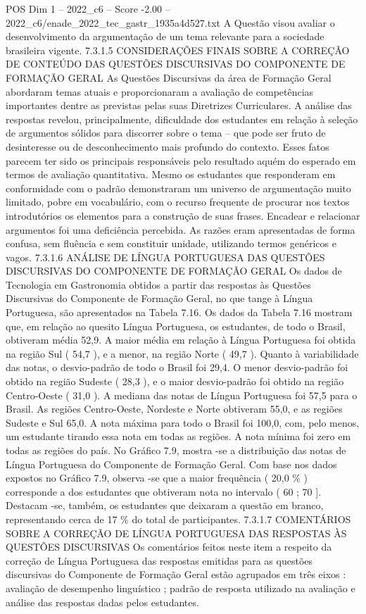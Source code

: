 \begin{textsample}{POS Dim 1 – 2022\_c6 – Score -2.00 – 2022\_c6/enade\_2022\_tec\_gastr\_1935a4d527.txt}
A Questão visou avaliar o desenvolvimento da argumentação de um tema relevante para a sociedade brasileira vigente. 7.3.1.5 CONSIDERAÇÕES FINAIS SOBRE A CORREÇÃO DE CONTEÚDO DAS QUESTÕES DISCURSIVAS DO COMPONENTE DE FORMAÇÃO GERAL As Questões Discursivas da área de Formação Geral abordaram temas atuais e proporcionaram a avaliação de competências importantes dentre as previstas pelas suas Diretrizes Curriculares.
A análise das respostas revelou, principalmente, dificuldade dos estudantes em relação à seleção de argumentos sólidos para discorrer sobre o tema – que pode ser fruto de desinteresse ou de desconhecimento mais profundo do contexto.
Esses fatos parecem ter sido os principais responsáveis pelo resultado aquém do esperado em termos de avaliação quantitativa.
Mesmo os estudantes que responderam em conformidade com o padrão demonstraram um universo de argumentação muito limitado, pobre em vocabulário, com o recurso frequente de procurar nos textos introdutórios os elementos para a construção de suas frases.
Encadear e relacionar argumentos foi uma deficiência percebida.
As razões eram apresentadas de forma confusa, sem fluência e sem constituir unidade, utilizando termos genéricos e vagos. 7.3.1.6 ANÁLISE DE LÍNGUA PORTUGUESA DAS QUESTÕES DISCURSIVAS DO COMPONENTE DE FORMAÇÃO GERAL Os dados de Tecnologia em Gastronomia obtidos a partir das respostas às Questões Discursivas do Componente de Formação Geral, no que tange à Língua Portuguesa, são apresentados na Tabela 7.16.
Os dados da Tabela 7.16 mostram que, em relação ao quesito Língua Portuguesa, os estudantes, de todo o Brasil, obtiveram média 52,9.
A maior média em relação à Língua Portuguesa foi obtida na região Sul ( 54,7 ), e a menor, na região Norte ( 49,7 ).
Quanto à variabilidade das notas, o desvio-padrão de todo o Brasil foi 29,4.
O menor desvio-padrão foi obtido na região Sudeste ( 28,3 ), e o maior desvio-padrão foi obtido na região Centro-Oeste ( 31,0 ).
A mediana das notas de Língua Portuguesa foi 57,5 para o Brasil.
As regiões Centro-Oeste, Nordeste e Norte obtiveram 55,0, e as regiões Sudeste e Sul 65,0.
A nota máxima para todo o Brasil foi 100,0, com, pelo menos, um estudante tirando essa nota em todas as regiões.
A nota mínima foi zero em todas as regiões do país.
No Gráfico 7.9, mostra -se a distribuição das notas de Língua Portuguesa do Componente de Formação Geral.
Com base nos dados expostos no Gráfico 7.9, observa -se que a maior frequência ( 20,0 \% ) corresponde a dos estudantes que obtiveram nota no intervalo ( 60 ; 70 ].
Destacam -se, também, os estudantes que deixaram a questão em branco, representando cerca de 17 \% do total de participantes. 7.3.1.7 COMENTÁRIOS SOBRE A CORREÇÃO DE LÍNGUA PORTUGUESA DAS RESPOSTAS ÀS QUESTÕES DISCURSIVAS Os comentários feitos neste item a respeito da correção de Língua Portuguesa das respostas emitidas para as questões discursivas do Componente de Formação Geral estão agrupados em três eixos : avaliação de desempenho linguístico ; padrão de resposta utilizado na avaliação e análise das respostas dadas pelos estudantes.

\end{textsample}
